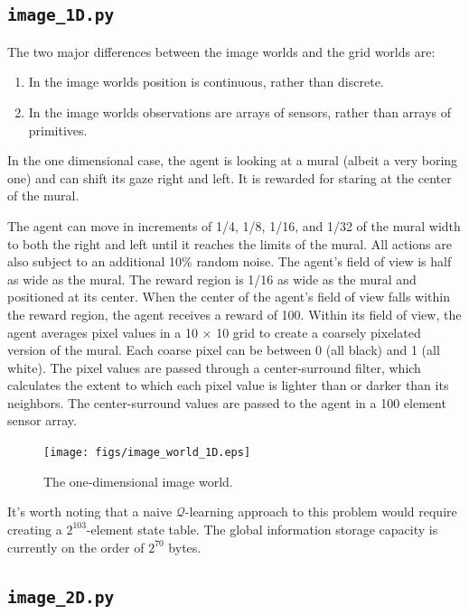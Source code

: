 \subsection{\texttt{image\_1D.py}}

The two major differences between the image worlds and the grid worlds are:

\begin{enumerate}
\item In the image worlds position is continuous, rather than discrete.
\item In the image worlds observations are arrays of sensors, rather than arrays of primitives.
\end{enumerate}

In the one dimensional case, the agent is looking at a mural (albeit a very boring one) and can shift its gaze right and left. It is rewarded for staring at the center of the mural.

The agent can move in increments of 1/4, 1/8, 1/16, and 1/32 of the mural width to both the right and left until it reaches the limits of the mural. All actions are also subject to an additional 10\% random noise. The agent's field of view is half as wide as the mural. The reward region is 1/16 as wide as the mural and positioned at its center. When the center of the agent's field of view falls within the reward region, the agent receives a reward of 100. Within its field of view, the agent averages pixel values in a 10 $\times$ 10 grid to create a coarsely pixelated version of the mural. Each coarse pixel can be between 0 (all black) and 1 (all white). The pixel values are passed through a center-surround filter, which calculates the extent to which each pixel value is lighter than or darker than its neighbors. The center-surround values are passed to the agent in a 100 element sensor array.

\begin{figure}
\centering
\texttt{[image: figs/image\_world\_1D.eps]}
\caption{The one-dimensional image world.}
\label{image_1D}
\end{figure}

It's worth noting that a naive $\mathcal{Q}$-learning approach to this problem would require creating a $2^103$-element state table. The global information storage capacity is currently on the order of $2^70$ bytes.

\subsection{\texttt{image\_2D.py}}

